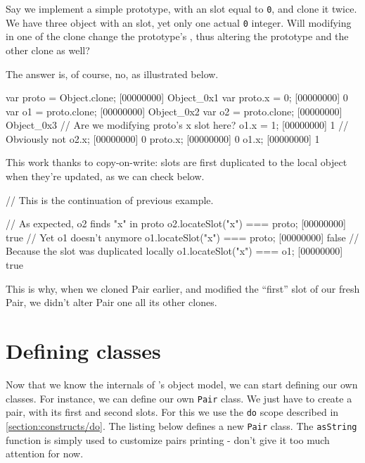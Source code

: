 Say we implement a simple prototype, with an  slot equal to
\lstinline|0|, and clone it twice. We have three object with an
 slot, yet only one actual \lstinline|0| integer. Will
modifying  in one of the clone change the prototype's ,
thus altering the prototype and the other clone as well?

The answer is, of course, no, as illustrated below.

\begin{urbiscript}
var proto = Object.clone;
[00000000] Object_0x1
var proto.x = 0;
[00000000] 0
var o1 = proto.clone;
[00000000] Object_0x2
var o2 = proto.clone;
[00000000] Object_0x3
// Are we modifying proto's x slot here?
o1.x = 1;
[00000000] 1
// Obviously not
o2.x;
[00000000] 0
proto.x;
[00000000] 0
o1.x;
[00000000] 1
\end{urbiscript}

This work thanks to copy-on-write: slots are first duplicated to the
local object when they're updated, as we can check below.

\begin{urbiscript}[firstnumber=last]
// This is the continuation of previous example.

// As expected, o2 finds "x" in proto
o2.locateSlot("x") === proto;
[00000000] true
// Yet o1 doesn't anymore
o1.locateSlot("x") === proto;
[00000000] false
// Because the slot was duplicated locally
o1.locateSlot("x") === o1;
[00000000] true
\end{urbiscript}

This is why, when we cloned Pair earlier, and modified the ``first''
slot of our fresh Pair, we didn't alter Pair one all its other clones.

\section{Defining classes}

Now that we know the internals of \us's object model, we can start
defining our own classes. For instance, we can define our own
\lstinline{Pair} class. We just have to create a pair, with its first and
second slots. For this we use the \lstinline{do} scope described in
\autoref{section:constructs/do}. The listing below defines a new
\lstinline{Pair} class. The \lstinline{asString} function is simply used to
customize pairs printing - don't give it too much attention for now.

